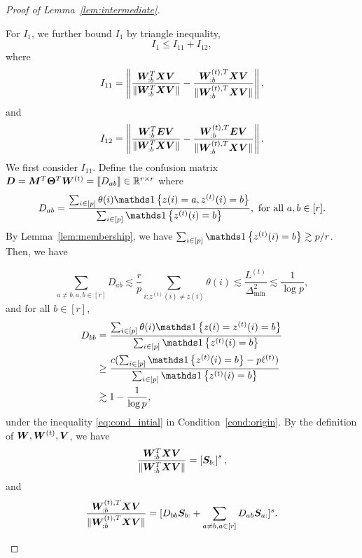 \documentclass[journal]{IEEEtran}
\theoremstyle{definition}
\theoremstyle{definition}
\newcommand{\off}[1]{\left[#1\right]}
\newcommand{\offf}[1]{\left\{#1\right\}}
\begin{document}
\begin{proof}[Proof of Lemma~\ref{lem:intermediate}]
\begin{enumerate}[wide]
    For $I_1$, we further bound $I_1$ by triangle inequality,
    \begin{equation}
        I_1 \leq I_{11} + I_{12},
    \end{equation}
    where
 \begin{equation}
        I_{11} = \left\lVert \frac{ \bm{W}_{:b}^T \bm X \bm{V}  }{\lVert  \bm{W}_{:b}^T \bm X \bm{V} \rVert} - \frac{ \bm{W}_{:b}^{(t), T} \bm X \bm{V}  }{ \lVert\bm{W}_{:b}^{(t), T} \bm X \bm{V} \rVert}   \right\rVert,
    \end{equation}
    and 
    \begin{equation}
        I_{12} = \left\lVert \frac{\bm{W}_{:b}^T \bm{E} \bm{V}}{ \lVert  \bm{W}_{:b}^T \bm X \bm{V} \rVert} - \frac{\bm{W}_{:b}^{(t),T} \bm{E} \bm{V}}{ \lVert  \bm{W}_{:b}^{(t),T} \bm X \bm{V} \rVert} \right\rVert.
    \end{equation}
    We first consider $I_{11}$. Define the confusion matrix $\bm{D} = \bm M^T \boldsymbol{\Theta}^T \bm{W}^{(t)} = \llbracket D_{ab} \rrbracket \in \mathbb{R}^{r \times r}$ where 
    \begin{equation}
        D_{ab} = \frac{\sum_{i \in [p]}  \theta(i) \ind \offf{ z(i) = a, z^{(t)}(i) = b } }{\sum_{i \in [p]}  \ind\offf{  z^{(t)}(i) = b }}, \text{  for all } a, b \in [r].
    \end{equation}
    By Lemma~\ref{lem:membership},  we have $\sum_{i \in [p]}  \ind\offf{  z^{(t)}(i) = b } \gtrsim p/r$. Then, we have

    \vspace{-0.5cm}
    \small
    \begin{equation}\label{eq:dab_bound}
        \sum_{a \neq b, a,b \in [r]} D_{ab} \lesssim \frac{r}{p} \sum_{i \colon z^{(t)}(i) \neq z(i)} \theta(i) \lesssim\frac{L^{(t)}}{\Delta_{\min}^2}  \lesssim \frac{1}{\log p}, 
    \end{equation}
    \normalsize
    and for all $b \in [r]$,
    \begin{align}
        D_{bb} &= \frac{\sum_{i \in [p]}  \theta(i) \ind \offf{ z(i) = z^{(t)}(i) = b } }{\sum_{i \in [p]}  \ind\offf{  z^{(t)}(i) = b }} \\
        &\geq \frac{c(\sum_{i \in [p]}  \ind\offf{  z^{(t)}(i) = b } - p\ell^{(t)})}{\sum_{i \in [p]}  \ind\offf{  z^{(t)}(i) = b }} \\
        &\gtrsim 1 - \frac{1}{\log p},\label{eq:dbb_bound}
    \end{align}
    under the inequality \eqref{eq:cond_intial} in Condition~\ref{cond:origin}. By the definition of $\bm{W},\bm{W}^{(t)},\bm{V}$, we have 
    \begin{align}
        \frac{ \mW_{:b}^T \mX \mV  }{\onormSize{}{  \mW_{:b}^T \mX \mV }} = \off{\mS_{b:}}^s,
    \end{align}
    and 
    \begin{equation}
        \frac{ \bm{W}_{:b}^{(t), T} \bm X \bm{V}  }{ \lVert\bm{W}_{:b}^{(t), T} \bm X \bm{V} \rVert} = [D_{bb} \bm S_{b:} + \sum_{a \neq b, a \in [r]} D_{ab} \bm S_{a:}]^s.
    \end{equation}


\end{enumerate}
\end{proof}
\end{document}

